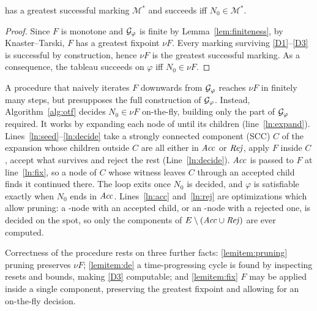 %

\begin{lemma}\label{prop:gfp}
\TabGraph has a greatest successful marking $\mathcal{M}^*$ and succeeds
iff $N_0\in\mathcal{M}^*$.
\end{lemma}
\begin{proof}
Since $F$ is monotone and $\mathcal{G}_{\varphi}$ is finite by Lemma~\ref{lem:finiteness}, by Knaster--Tarski, $F$ has a greatest fixpoint $\nu F$. Every marking surviving \ref{D1}--\ref{D3} is successful by construction, hence $\nu F$ is the greatest successful marking. As a consequence, the tableau succeeds on $\varphi$ iff $N_0\in\nu F$.
\end{proof}


A procedure that naively iterates $F$ downwards from $\mathcal{G}_{\varphi}$ reaches $\nu F$ in finitely many steps, but presupposes
the full construction of $\mathcal{G}_{\varphi}$. Instead, Algorithm~\ref{alg:otf} decides $N_0\in\nu F$ on-the-fly, building only the part of $\mathcal{G}_{\varphi}$ required. It works by expanding each node of \TabGraph until its children (line~\ref{ln:expand}). Lines~\ref{ln:seed}--\ref{ln:decide} take a strongly
connected component (SCC) $C$ of the expansion whose children outside $C$ are all either in $\mathit{Acc}$
or $\mathit{Rej}$, apply $F$ inside $C$, accept what survives and reject the rest (Line~\ref{ln:decide}). $\mathit{Acc}$ is
passed to $F$ at line~\ref{ln:fix}, so a node of $C$ whose witness leaves $C$ through an accepted
child finds it continued there.
The loop exits once $N_0$ is decided, and $\varphi$ is
satisfiable exactly when $N_0$ ends in $\mathit{Acc}$. Lines~\ref{ln:acc} and~\ref{ln:rej} are optimizations which allow pruning: a \ORn-node with an accepted child, or an \ANDn-node with
a rejected one, is decided on the spot, so only the components of $E\setminus (\mathit{Acc}\cup\mathit{Rej})$ are ever computed.



Correctness of the procedure rests on three further facts: \ref{lemitem:pruning} pruning preserves $\nu F$; \ref{lemitem:de} a time-progressing cycle is found by inspecting resets and bounds, making \ref{D3} computable; and \ref{lemitem:fix} $F$ may be applied inside a single component, preserving the greatest fixpoint and allowing for an on-the-fly decision.

